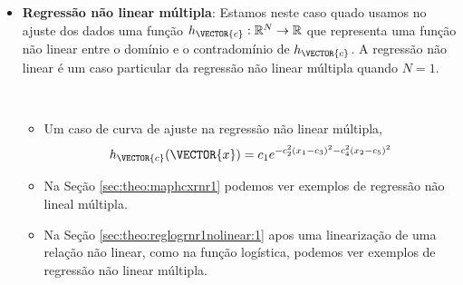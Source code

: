 \begin{itemize}
\item \textbf{Regressão não linear múltipla}: 
Estamos neste caso quado usamos no ajuste dos dados
uma função $h_{\VECTOR{c}}:\mathbb{R}^{N} \rightarrow \mathbb{R}$ 
que representa uma função não linear entre o domínio e o contradomínio de $h_{\VECTOR{c}}$.
A regressão não linear é um caso particular da regressão não linear múltipla quando $N=1$.
\begin{example}~
\begin{itemize}
\item Um caso de curva de ajuste na regressão não linear múltipla, 
\begin{equation}
h_{\VECTOR{c}}(\VECTOR{x})=c_1 e^{- c_2^2(x_1 -c_3)^2- c_4^2(x_2 -c_5)^2}
\end{equation}
\item Na Seção \ref{sec:theo:maphcxrnr1} podemos ver exemplos de regressão não lineal múltipla.
\item Na Seção \ref{sec:theo:reglogrnr1nolinear:1} apos uma linearização de uma relação não linear,
como na função logística, podemos ver exemplos de regressão não linear múltipla.
\end{itemize}
\end{example}
\end{itemize}
